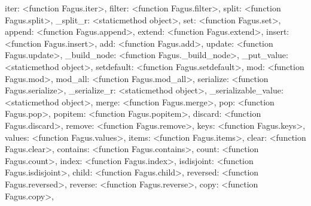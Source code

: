 \documentclass[a4paper,10pt,english]{sphinxmanual}
\begin{document}
\begin{fulllineitems}
\begin{fulllineitems}
\textquotesingle{}iter\textquotesingle{}: \textless{}function Fagus.iter\textgreater{}, \textquotesingle{}filter\textquotesingle{}: \textless{}function Fagus.filter\textgreater{}, \textquotesingle{}split\textquotesingle{}: \textless{}function Fagus.split\textgreater{}, \textquotesingle{}\_split\_r\textquotesingle{}: \textless{}staticmethod object\textgreater{}, \textquotesingle{}set\textquotesingle{}: \textless{}function Fagus.set\textgreater{}, \textquotesingle{}append\textquotesingle{}: \textless{}function Fagus.append\textgreater{}, \textquotesingle{}extend\textquotesingle{}: \textless{}function Fagus.extend\textgreater{}, \textquotesingle{}insert\textquotesingle{}: \textless{}function Fagus.insert\textgreater{}, \textquotesingle{}add\textquotesingle{}: \textless{}function Fagus.add\textgreater{}, \textquotesingle{}update\textquotesingle{}: \textless{}function Fagus.update\textgreater{}, \textquotesingle{}\_build\_node\textquotesingle{}: \textless{}function Fagus.\_build\_node\textgreater{}, \textquotesingle{}\_put\_value\textquotesingle{}: \textless{}staticmethod object\textgreater{}, \textquotesingle{}setdefault\textquotesingle{}: \textless{}function Fagus.setdefault\textgreater{}, \textquotesingle{}mod\textquotesingle{}: \textless{}function Fagus.mod\textgreater{}, \textquotesingle{}mod\_all\textquotesingle{}: \textless{}function Fagus.mod\_all\textgreater{}, \textquotesingle{}serialize\textquotesingle{}: \textless{}function Fagus.serialize\textgreater{}, \textquotesingle{}\_serialize\_r\textquotesingle{}: \textless{}staticmethod object\textgreater{}, \textquotesingle{}\_serializable\_value\textquotesingle{}: \textless{}staticmethod object\textgreater{}, \textquotesingle{}merge\textquotesingle{}: \textless{}function Fagus.merge\textgreater{}, \textquotesingle{}pop\textquotesingle{}: \textless{}function Fagus.pop\textgreater{}, \textquotesingle{}popitem\textquotesingle{}: \textless{}function Fagus.popitem\textgreater{}, \textquotesingle{}discard\textquotesingle{}: \textless{}function Fagus.discard\textgreater{}, \textquotesingle{}remove\textquotesingle{}: \textless{}function Fagus.remove\textgreater{}, \textquotesingle{}keys\textquotesingle{}: \textless{}function Fagus.keys\textgreater{}, \textquotesingle{}values\textquotesingle{}: \textless{}function Fagus.values\textgreater{}, \textquotesingle{}items\textquotesingle{}: \textless{}function Fagus.items\textgreater{}, \textquotesingle{}clear\textquotesingle{}: \textless{}function Fagus.clear\textgreater{}, \textquotesingle{}contains\textquotesingle{}: \textless{}function Fagus.contains\textgreater{}, \textquotesingle{}count\textquotesingle{}: \textless{}function Fagus.count\textgreater{}, \textquotesingle{}index\textquotesingle{}: \textless{}function Fagus.index\textgreater{}, \textquotesingle{}isdisjoint\textquotesingle{}: \textless{}function Fagus.isdisjoint\textgreater{}, \textquotesingle{}child\textquotesingle{}: \textless{}function Fagus.child\textgreater{}, \textquotesingle{}reversed\textquotesingle{}: \textless{}function Fagus.reversed\textgreater{}, \textquotesingle{}reverse\textquotesingle{}: \textless{}function Fagus.reverse\textgreater{}, \textquotesingle{}copy\textquotesingle{}: \textless{}function Fagus.copy\textgreater{}, 
\end{fulllineitems}
\end{fulllineitems}
\end{document}
